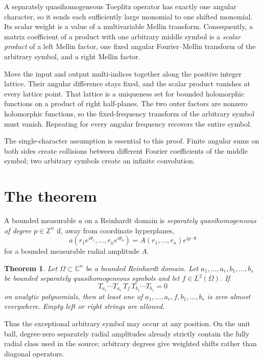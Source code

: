 \documentclass[11pt]{article}
\newtheorem{theorem}{Theorem}
\newcommand{\Z}{\mathbb Z}
\newcommand{\C}{\mathbb C}
\newcommand{\Om}{\Omega}
\begin{document}
A separately quasihomogeneous Toeplitz operator has exactly one angular
character, so it sends each sufficiently large monomial to one shifted
monomial.  Its scalar weight is a value of a multivariable Mellin transform.
Consequently, a matrix coefficient of a product with one arbitrary middle
symbol is a \emph{scalar product} of a left Mellin factor, one fixed angular
Fourier--Mellin transform of the arbitrary symbol, and a right Mellin factor.

Move the input and output multi-indices together along the positive integer
lattice.  Their angular difference stays fixed, and the scalar product
vanishes at every lattice point.  That lattice is a uniqueness set for
bounded holomorphic functions on a product of right half-planes.  The two
outer factors are nonzero holomorphic functions, so the fixed-frequency
transform of the arbitrary symbol must vanish.  Repeating for every angular
frequency recovers the entire symbol.

The single-character assumption is essential to this proof.  Finite angular
sums on both sides create collisions between different Fourier coefficients
of the middle symbol; two arbitrary symbols create an infinite convolution.

\section{The theorem}

A bounded measurable $a$ on a Reinhardt domain is \emph{separately
quasihomogeneous of degree $p\in\Z^n$} if, away from coordinate hyperplanes,
\[
 a(r_1e^{i\theta_1},\ldots,r_ne^{i\theta_n})
 =A(r_1,\ldots,r_n)e^{i p\cdot\theta}                  \tag{3.1}
\]
for a bounded measurable radial amplitude $A$.

\begin{theorem}\label{thm:main}
Let $\Om\subset\C^n$ be a bounded Reinhardt domain.  Let
$a_1,\ldots,a_r,b_1,\ldots,b_s$ be bounded separately
quasihomogeneous symbols and let $f\in L^2(\Om)$.  If
\[
 T_{a_1}\cdots T_{a_r}\,T_f\,T_{b_1}\cdots T_{b_s}=0 \tag{3.2}
\]
on analytic polynomials, then at least one of
$a_1,\ldots,a_r,f,b_1,\ldots,b_s$ is zero almost everywhere.  Empty left or
right strings are allowed.
\end{theorem}

Thus the exceptional arbitrary symbol may occur at any position.  On the
unit ball, degree-zero separately radial amplitudes already strictly contain
the fully radial class used in the source; arbitrary degrees give weighted
shifts rather than diagonal operators.
\end{document}
